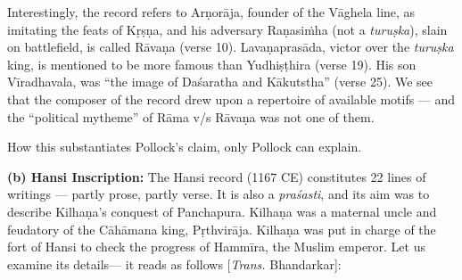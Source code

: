 Interestingly, the record refers to Arṇorāja, founder of the Vāghela line, as imitating the feats of Kṛṣṇa, and his adversary Raṇasiṁha (not a {\sl turuṣka}), slain on battlefield, is called Rāvaṇa (verse 10). Lavaṇaprasāda, victor over the {\sl turuṣka} king, is mentioned to be more famous than Yudhiṣṭhira (verse 19). His son Vīradhavala, was “the image of Daśaratha and Kākutstha” (verse 25). We see that the composer of the record drew upon a repertoire of available motifs — and the “political mytheme” of Rāma v/s Rāvaṇa was not one of them. 

How this substantiates Pollock’s claim, only Pollock can explain. 

\smallskip
\noindent
{\bf (b) Hansi Inscription:} The Hansi record (1167 CE) constitutes 22 lines of writings — partly prose, partly verse. It is also a {\sl praśasti}, and its aim was to describe Kilhaṇa’s conquest of Panchapura. Kilhaṇa was a maternal uncle and feudatory of the Cāhāmana king, Pṛthvirāja. Kilhaṇa was put in charge of the fort of Hansi to check the progress of Hammīra, the Muslim emperor. Let us examine its details— it reads as follows [{\sl Trans.} Bhandarkar]:

